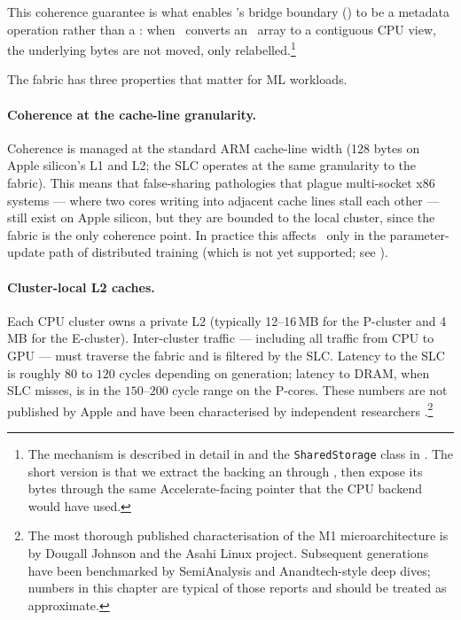 This coherence guarantee is what enables \Lucid's bridge boundary
() to be a metadata operation rather than
a : when \Lucid\ converts an \MLX\ array to a
contiguous CPU view, the underlying bytes are not moved, only
relabelled.\footnote{The mechanism is described in detail in
 and the \texttt{SharedStorage} class in
. The short version is
that we extract the  backing an 
through , then expose its bytes
through the same Accelerate-facing pointer that the CPU backend would
have used.}

The fabric has three properties that matter for ML workloads.

\paragraph{Coherence at the cache-line granularity.} Coherence is
managed at the standard ARM cache-line width (128 bytes on Apple
silicon's L1 and L2; the SLC operates at the same granularity to the
fabric). This means that false-sharing pathologies that plague
multi-socket x86 systems --- where two cores writing into adjacent
cache lines stall each other --- still exist on Apple silicon, but
they are bounded to the local cluster, since the fabric is the only
coherence point. In practice this affects \Lucid\ only in the
parameter-update path of distributed training (which is not yet
supported; see ).

\paragraph{Cluster-local L2 caches.} Each CPU cluster owns a private
L2 (typically 12--16\,MB for the P-cluster and 4\,MB for the
E-cluster). Inter-cluster traffic --- including all traffic from CPU
to GPU --- must traverse the fabric and is filtered by the SLC.
Latency to the SLC is roughly $80$ to $120$ cycles depending on
generation; latency to DRAM, when SLC misses, is in the $150$--$200$
cycle range on the P-cores. These numbers are not published by Apple
and have been characterised by independent researchers
\cite{johnson_m1_microarch_2021}.\footnote{The
most thorough published characterisation of the M1 microarchitecture
is by Dougall Johnson and the Asahi Linux project. Subsequent
generations have been benchmarked by SemiAnalysis and Anandtech-style
deep dives; numbers in this chapter are typical of those reports and
should be treated as approximate.}

